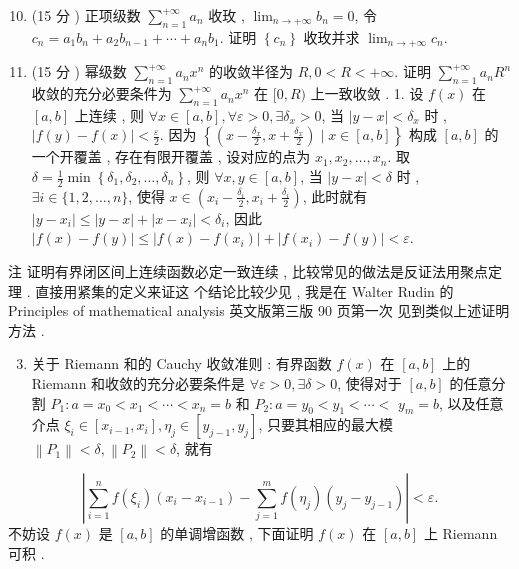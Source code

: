 \documentclass[10pt]{article}
\begin{document}
\begin{enumerate}
  \setcounter{enumi}{9}
  \item (15  分 )  正项级数  $\sum_{n=1}^{+\infty} a_{n}$  收玫 , $\lim _{n \rightarrow+\infty} b_{n}=0$,  令  $c_{n}=a_{1} b_{n}+a_{2} b_{n-1}+\cdots+a_{n} b_{1}$.  证明  $\left\{c_{n}\right\}$  收玫并求  $\lim _{n \rightarrow+\infty} c_{n}$.

  \item (15  分 )  幂级数  $\sum_{n=1}^{+\infty} a_{n} x^{n}$  的收敛半径为  $R, 0<R<+\infty$.  证明  $\sum_{n=1}^{+\infty} a_{n} R^{n}$  收敛的充分必要条件为  $\sum_{n=1}^{+\infty} a_{n} x^{n}$  在  $[0, R)$  上一致收敛 . 1.  设  $f(x)$  在  $[a, b]$  上连续 ,  则  $\forall x \in[a, b], \forall \varepsilon>0, \exists \delta_{x}>0$,  当  $|y-x|<\delta_{x}$  时 , $|f(y)-f(x)|<\frac{\varepsilon}{2}$.  因为  $\left\{\left(x-\frac{\delta_{x}}{2}, x+\frac{\delta_{x}}{2}\right) \mid x \in[a, b]\right\}$  构成  $[a, b]$  的一个开覆盖 ,  存在有限开覆盖 ,  设对应的点为  $x_{1}, x_{2}, \ldots, x_{n}$.  取  $\delta=\frac{1}{2} \min \left\{\delta_{1}, \delta_{2}, \ldots, \delta_{n}\right\}$,  则  $\forall x, y \in[a, b]$,  当  $|y-x|<\delta$  时 , $\exists i \in\{1,2, \ldots, n\}$,  使得  $x \in\left(x_{i}-\frac{\delta_{i}}{2}, x_{i}+\frac{\delta_{i}}{2}\right)$,  此时就有  $\left|y-x_{i}\right| \leqslant|y-x|+\left|x-x_{i}\right|<\delta_{i}$,  因此  $|f(x)-f(y)| \leqslant\left|f(x)-f\left(x_{i}\right)\right|+\left|f\left(x_{i}\right)-f(y)\right|<\varepsilon$.

\end{enumerate}
 注   证明有界闭区间上连续函数必定一致连续 ,  比较常见的做法是反证法用聚点定理 .  直接用紧集的定义来证这   个结论比较少见 ,  我是在  Walter Rudin  的  Principles of mathematical analysis  英文版第三版  90  页第一次   见到类似上述证明方法 .

\begin{enumerate}
  \setcounter{enumi}{2}
  \item  关于  Riemann  和的  Cauchy  收敛准则 :  有界函数  $f(x)$  在  $[a, b]$  上的  Riemann  和收敛的充分必要条件是  $\forall \varepsilon>0, \exists \delta>0$,  使得对于  $[a, b]$  的任意分割  $P_{1}: a=x_{0}<x_{1}<\cdots<x_{n}=b$  和  $P_{2}: a=y_{0}<y_{1}<\cdots<$ $y_{m}=b$,  以及任意介点  $\xi_{i} \in\left[x_{i-1}, x_{i}\right], \eta_{j} \in\left[y_{j-1}, y_{j}\right]$,  只要其相应的最大模  $\left\|P_{1}\right\|<\delta,\left\|P_{2}\right\|<\delta$,  就有 
\end{enumerate}
$$
\left|\sum_{i=1}^{n} f\left(\xi_{i}\right)\left(x_{i}-x_{i-1}\right)-\sum_{j=1}^{m} f\left(\eta_{j}\right)\left(y_{j}-y_{j-1}\right)\right|<\varepsilon .
$$
 不妨设  $f(x)$  是  $[a, b]$  的单调增函数 ,  下面证明  $f(x)$  在  $[a, b]$  上  Riemann  可积 .
\end{document}

